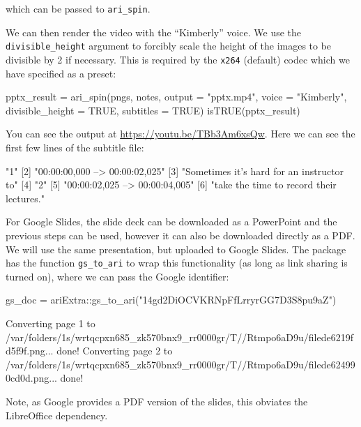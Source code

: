 which can be passed to \texttt{ari\_spin}.

We can then render the video with the ``Kimberly'' voice. We use the
\texttt{divisible\_height} argument to forcibly scale the height of the
images to be divisible by 2 if necessary. This is required by the
\texttt{x264} (default) codec which we have specified as a preset:

\begin{Schunk}
\begin{Sinput}
pptx_result = ari_spin(pngs, notes, output = "pptx.mp4", voice = "Kimberly",
    divisible_height = TRUE, subtitles = TRUE)
isTRUE(pptx_result)
\end{Sinput}
\end{Schunk}

You can see the output at \url{https://youtu.be/TBb3Am6xsQw}. Here we
can see the first few lines of the subtitle file:

\begin{Schunk}
\begin{Soutput}
[1] "1"                                       
[2] "00:00:00,000 --> 00:00:02,025"           
[3] "Sometimes it’s hard for an instructor to"
[4] "2"                                       
[5] "00:00:02,025 --> 00:00:04,005"           
[6] "take the time to record their lectures." 
\end{Soutput}
\end{Schunk}

For Google Slides, the slide deck can be downloaded as a PowerPoint and
the previous steps can be used, however it can also be downloaded
directly as a PDF. We will use the same presentation, but uploaded to
Google Slides. The  package has the function
\texttt{gs\_to\_ari} to wrap this functionality (as long as link sharing
is turned on), where we can pass the Google identifier:

\begin{Schunk}
\begin{Sinput}
gs_doc = ariExtra::gs_to_ari("14gd2DiOCVKRNpFfLrryrGG7D3S8pu9aZ")
\end{Sinput}
\begin{Soutput}
Converting page 1 to /var/folders/1s/wrtqcpxn685_zk570bnx9_rr0000gr/T//Rtmpo6aD9u/filede6219fd5f9f.png... done!
Converting page 2 to /var/folders/1s/wrtqcpxn685_zk570bnx9_rr0000gr/T//Rtmpo6aD9u/filede624990cd0d.png... done!
\end{Soutput}
\end{Schunk}

Note, as Google provides a PDF version of the slides, this obviates the
LibreOffice dependency.


